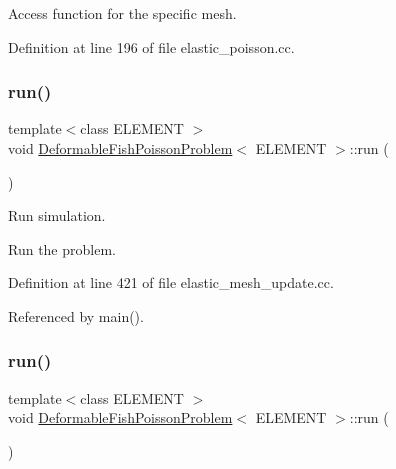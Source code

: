 Access function for the specific mesh. 



Definition at line 196 of file elastic\+\_\+poisson.\+cc.

\mbox{\label{classDeformableFishPoissonProblem_a0ef0e4ab464ab41a6f0b7e8a74a9c8a5}} 
\subsubsection{\texorpdfstring{run()}{run()}\hspace{0.1cm}{\footnotesize\ttfamily [1/2]}}
{\footnotesize\ttfamily template$<$class E\+L\+E\+M\+E\+NT $>$ \\
void \hyperlink{classDeformableFishPoissonProblem}{Deformable\+Fish\+Poisson\+Problem}$<$ E\+L\+E\+M\+E\+NT $>$\+::run (\begin{DoxyParamCaption}{ }\end{DoxyParamCaption})}



Run simulation. 

Run the problem. 

Definition at line 421 of file elastic\+\_\+mesh\+\_\+update.\+cc.



Referenced by main().

\mbox{\label{classDeformableFishPoissonProblem_a0ef0e4ab464ab41a6f0b7e8a74a9c8a5}} 
\subsubsection{\texorpdfstring{run()}{run()}\hspace{0.1cm}{\footnotesize\ttfamily [2/2]}}
{\footnotesize\ttfamily template$<$class E\+L\+E\+M\+E\+NT $>$ \\
void \hyperlink{classDeformableFishPoissonProblem}{Deformable\+Fish\+Poisson\+Problem}$<$ E\+L\+E\+M\+E\+NT $>$\+::run (\begin{DoxyParamCaption}{ }\end{DoxyParamCaption})}



